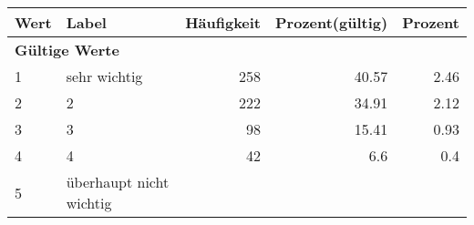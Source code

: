      \begin{longtable}{lXrrr}
     \toprule
     \textbf{Wert} & \textbf{Label} & \textbf{Häufigkeit} & \textbf{Prozent(gültig)} & \textbf{Prozent} \\
     \endhead
     \midrule
     \multicolumn{5}{l}{\textbf{Gültige Werte}}\\

     1 &
     \multicolumn{1}{X}{ sehr wichtig   } &


       \num{258} &
       \num[round-mode=places,round-precision=2]{40.57} &
         \num[round-mode=places,round-precision=2]{2.46} \\

     2 &
     \multicolumn{1}{X}{ 2   } &


       \num{222} &
       \num[round-mode=places,round-precision=2]{34.91} &
         \num[round-mode=places,round-precision=2]{2.12} \\

     3 &
     \multicolumn{1}{X}{ 3   } &


       \num{98} &
       \num[round-mode=places,round-precision=2]{15.41} &
         \num[round-mode=places,round-precision=2]{0.93} \\

     4 &
     \multicolumn{1}{X}{ 4   } &


       \num{42} &
       \num[round-mode=places,round-precision=2]{6.6} &
         \num[round-mode=places,round-precision=2]{0.4} \\

     5 &
     \multicolumn{1}{X}{ überhaupt nicht wichtig   } &



\end{longtable}
